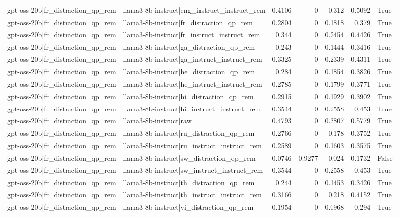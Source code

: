 \begin{table}
\begin{tabular}{l l r r r r l}
gpt-oss-20b|fr_distraction_qp_rem & llama3-8b-instruct|eng_instruct_instruct_rem & 0.4106 & 0 & 0.312 & 0.5092 & True \\
gpt-oss-20b|fr_distraction_qp_rem & llama3-8b-instruct|fr_distraction_qp_rem & 0.2804 & 0 & 0.1818 & 0.379 & True \\
gpt-oss-20b|fr_distraction_qp_rem & llama3-8b-instruct|fr_instruct_instruct_rem & 0.344 & 0 & 0.2454 & 0.4426 & True \\
gpt-oss-20b|fr_distraction_qp_rem & llama3-8b-instruct|ga_distraction_qp_rem & 0.243 & 0 & 0.1444 & 0.3416 & True \\
gpt-oss-20b|fr_distraction_qp_rem & llama3-8b-instruct|ga_instruct_instruct_rem & 0.3325 & 0 & 0.2339 & 0.4311 & True \\
gpt-oss-20b|fr_distraction_qp_rem & llama3-8b-instruct|he_distraction_qp_rem & 0.284 & 0 & 0.1854 & 0.3826 & True \\
gpt-oss-20b|fr_distraction_qp_rem & llama3-8b-instruct|he_instruct_instruct_rem & 0.2785 & 0 & 0.1799 & 0.3771 & True \\
gpt-oss-20b|fr_distraction_qp_rem & llama3-8b-instruct|hi_distraction_qp_rem & 0.2915 & 0 & 0.1929 & 0.3902 & True \\
gpt-oss-20b|fr_distraction_qp_rem & llama3-8b-instruct|hi_instruct_instruct_rem & 0.3544 & 0 & 0.2558 & 0.453 & True \\
gpt-oss-20b|fr_distraction_qp_rem & llama3-8b-instruct|raw & 0.4793 & 0 & 0.3807 & 0.5779 & True \\
gpt-oss-20b|fr_distraction_qp_rem & llama3-8b-instruct|ru_distraction_qp_rem & 0.2766 & 0 & 0.178 & 0.3752 & True \\
gpt-oss-20b|fr_distraction_qp_rem & llama3-8b-instruct|ru_instruct_instruct_rem & 0.2589 & 0 & 0.1603 & 0.3575 & True \\
gpt-oss-20b|fr_distraction_qp_rem & llama3-8b-instruct|sw_distraction_qp_rem & 0.0746 & 0.9277 & -0.024 & 0.1732 & False \\
gpt-oss-20b|fr_distraction_qp_rem & llama3-8b-instruct|sw_instruct_instruct_rem & 0.3544 & 0 & 0.2558 & 0.453 & True \\
gpt-oss-20b|fr_distraction_qp_rem & llama3-8b-instruct|th_distraction_qp_rem & 0.244 & 0 & 0.1453 & 0.3426 & True \\
gpt-oss-20b|fr_distraction_qp_rem & llama3-8b-instruct|th_instruct_instruct_rem & 0.3166 & 0 & 0.218 & 0.4152 & True \\
gpt-oss-20b|fr_distraction_qp_rem & llama3-8b-instruct|vi_distraction_qp_rem & 0.1954 & 0 & 0.0968 & 0.294 & True \\

\end{tabular}
\end{table}
